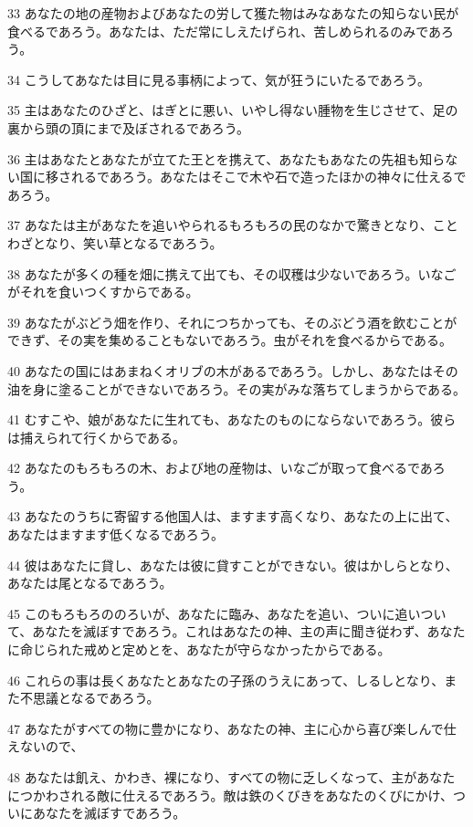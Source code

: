 \par 33 あなたの地の産物およびあなたの労して獲た物はみなあなたの知らない民が食べるであろう。あなたは、ただ常にしえたげられ、苦しめられるのみであろう。
\par 34 こうしてあなたは目に見る事柄によって、気が狂うにいたるであろう。
\par 35 主はあなたのひざと、はぎとに悪い、いやし得ない腫物を生じさせて、足の裏から頭の頂にまで及ぼされるであろう。
\par 36 主はあなたとあなたが立てた王とを携えて、あなたもあなたの先祖も知らない国に移されるであろう。あなたはそこで木や石で造ったほかの神々に仕えるであろう。
\par 37 あなたは主があなたを追いやられるもろもろの民のなかで驚きとなり、ことわざとなり、笑い草となるであろう。
\par 38 あなたが多くの種を畑に携えて出ても、その収穫は少ないであろう。いなごがそれを食いつくすからである。
\par 39 あなたがぶどう畑を作り、それにつちかっても、そのぶどう酒を飲むことができず、その実を集めることもないであろう。虫がそれを食べるからである。
\par 40 あなたの国にはあまねくオリブの木があるであろう。しかし、あなたはその油を身に塗ることができないであろう。その実がみな落ちてしまうからである。
\par 41 むすこや、娘があなたに生れても、あなたのものにならないであろう。彼らは捕えられて行くからである。
\par 42 あなたのもろもろの木、および地の産物は、いなごが取って食べるであろう。
\par 43 あなたのうちに寄留する他国人は、ますます高くなり、あなたの上に出て、あなたはますます低くなるであろう。
\par 44 彼はあなたに貸し、あなたは彼に貸すことができない。彼はかしらとなり、あなたは尾となるであろう。
\par 45 このもろもろののろいが、あなたに臨み、あなたを追い、ついに追いついて、あなたを滅ぼすであろう。これはあなたの神、主の声に聞き従わず、あなたに命じられた戒めと定めとを、あなたが守らなかったからである。
\par 46 これらの事は長くあなたとあなたの子孫のうえにあって、しるしとなり、また不思議となるであろう。
\par 47 あなたがすべての物に豊かになり、あなたの神、主に心から喜び楽しんで仕えないので、
\par 48 あなたは飢え、かわき、裸になり、すべての物に乏しくなって、主があなたにつかわされる敵に仕えるであろう。敵は鉄のくびきをあなたのくびにかけ、ついにあなたを滅ぼすであろう。
